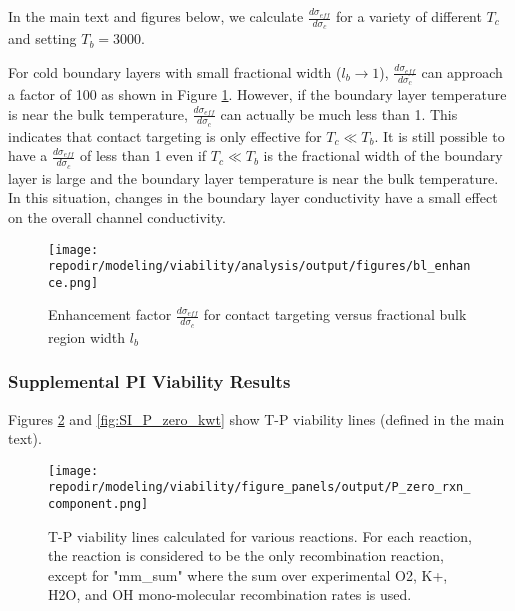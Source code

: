 
In the main text and figures below, we calculate $\frac{d\sigma_{eff}}{d\sigma_{c}}$ for a variety of different $T_{c}$ and setting $T_{b} = 3000$.

For cold boundary layers with small fractional width ($l_{b}\rightarrow1$), $\frac{d\sigma_{eff}}{d\sigma_{c}}$ can approach a factor of 100 as shown in Figure \ref{fig:SI_bl_enhance}. However, if the boundary layer temperature is near the bulk temperature, $\frac{d\sigma_{eff}}{d\sigma_{c}}$ can actually be much less than 1. This indicates that contact targeting is only effective for $T_{c} \ll T_{b}$. It is still possible to have a $\frac{d\sigma_{eff}}{d\sigma_{c}}$ of less than 1 even if $T_{c} \ll T_{b}$ is the fractional width of the boundary layer is large and the  boundary layer temperature is near the bulk temperature. In this situation, changes in the boundary layer conductivity have a small effect on the overall channel conductivity.

\begin{figure}[h]
    \centering
    \texttt{[image: \\repodir/modeling/viability/analysis/output/figures/bl\_enhance.png]} 
    \caption{Enhancement factor $\frac{d\sigma_{eff}}{d\sigma_{c}}$ for contact targeting versus fractional bulk region width $l_b$}
    \label{fig:SI_bl_enhance}
\end{figure}

\clearpage

\subsubsection{Supplemental PI Viability Results}

Figures \ref{fig:SI_P_zero_rxn_component} and \ref{fig:SI_P_zero_kwt} show T-P viability lines (defined in the main text). 

\begin{figure}[h]
    \centering
    \texttt{[image: \\repodir/modeling/viability/figure\_panels/output/P\_zero\_rxn\_component.png]} 
    \caption{T-P viability lines calculated for various reactions. For each reaction, the reaction is considered to be the only recombination reaction, except for "mm\_sum" where the sum over experimental O2, K+, H2O, and OH mono-molecular recombination rates is used.}
    \label{fig:SI_P_zero_rxn_component}
\end{figure}


